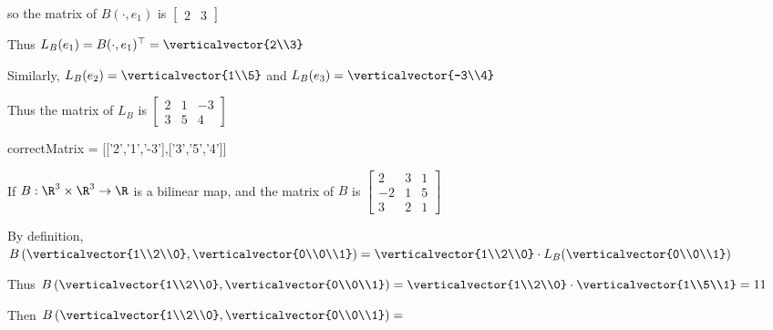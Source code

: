 \documentclass{ximera}
\begin{document}
\begin{question}
\begin{solution}
\begin{hint}
					so the matrix of $B(\cdot,e_1)$ is \(\begin{bmatrix} 2 &3\end{bmatrix}\)
				\end{hint}
				\begin{hint}
					Thus $L_B(e_1) = B(\cdot, e_1)^\top = \verticalvector{2\\3}$
				\end{hint}
				\begin{hint}
					Similarly, $L_B(e_2) = \verticalvector{1\\5}$ and $L_B(e_3)=\verticalvector{-3\\4}$
				\end{hint}
				\begin{hint}
					Thus the matrix of $L_B$ is \(\begin{bmatrix} 2&1&-3\\3&5&4\end{bmatrix}\)
				\end{hint}
				\begin{matrix-answer}
					correctMatrix = [['2','1','-3'],['3','5','4']]
				\end{matrix-answer}
			\end{solution}
	\end{question}
	
	\begin{question}
		If $B: \R^3 \times \R^3 \to \R$ is a bilinear map, and the matrix of $B$ is 
		\(\begin{bmatrix} 2 & 3 & 1 \\ -2  & 1& 5\\ 3&2 & 1\end{bmatrix}\)
		\begin{solution}
			\begin{hint}
				By definition, $B\left( \verticalvector{1\\2\\0}, \verticalvector{0\\0\\1}\right) = \verticalvector{1\\2\\0} \cdot L_B(\verticalvector{0\\0\\1})$
			\end{hint}
			\begin{hint}
				Thus $B\left( \verticalvector{1\\2\\0}, \verticalvector{0\\0\\1}\right) = \verticalvector{1\\2\\0} \cdot \verticalvector{1\\5\\1} = 11$
			\end{hint}
			Then $B\left( \verticalvector{1\\2\\0}, \verticalvector{0\\0\\1}\right) =$ 
		\end{solution}
	\end{question}
	
\end{document}
